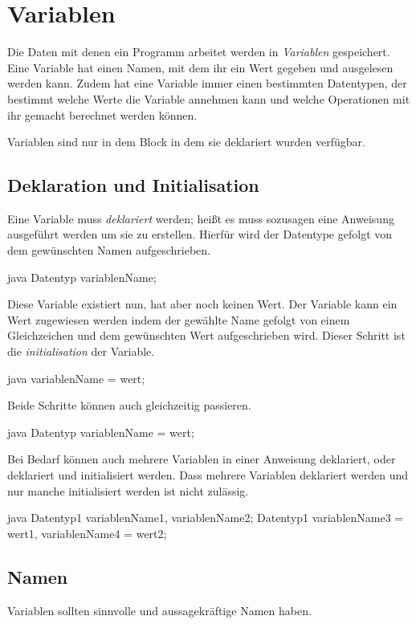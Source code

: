 \documentclass{article}
\begin{document}
\section{Variablen} 
Die Daten mit denen ein Programm arbeitet werden in \emph{Variablen} gespeichert. Eine Variable hat einen Namen, mit dem ihr ein Wert gegeben und ausgelesen werden kann. Zudem hat eine Variable immer einen bestimmten Datentypen, der bestimmt welche Werte die Variable annehmen kann und welche Operationen mit ihr gemacht berechnet werden können.

Variablen sind nur in dem Block in dem sie deklariert wurden verfügbar.

\subsection{Deklaration und Initialisation}
Eine Variable muss \emph{deklariert} werden; heißt es muss sozusagen eine Anweisung ausgeführt werden um sie zu erstellen. Hierfür wird der Datentype gefolgt von dem gewünschten Namen aufgeschrieben.
\begin{slsourcecode}{java}
Datentyp variablenName;
\end{slsourcecode}
Diese Variable existiert nun, hat aber noch keinen Wert. Der Variable kann ein Wert zugewiesen werden indem der gewählte Name gefolgt von einem Gleichzeichen und dem gewünschten Wert aufgeschrieben wird. Dieser Schritt ist die \emph{initialisation} der Variable.
\begin{slsourcecode}{java}
variablenName = wert;
\end{slsourcecode}
Beide Schritte können auch gleichzeitig passieren.
\begin{slsourcecode}{java}
Datentyp variablenName = wert;
\end{slsourcecode}
Bei Bedarf können auch mehrere Variablen in einer Anweisung deklariert, oder deklariert und initialisiert werden. Dass mehrere Variablen deklariert werden und nur manche initialisiert werden ist nicht zulässig.
\begin{slsourcecode}{java}
Datentyp1 variablenName1, variablenName2;
Datentyp1 variablenName3 = wert1, variablenName4 = wert2;
\end{slsourcecode}


\subsection{Namen}
Variablen sollten sinnvolle und aussagekräftige Namen haben.
\end{document}
